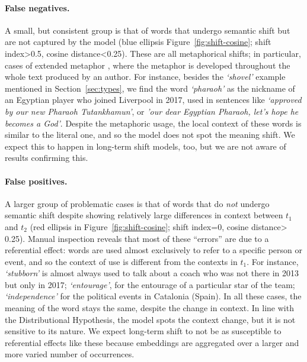 \paragraph{False negatives.}
A small, but consistent group is that of %
words that undergo semantic shift but are not captured by the model
(blue ellipsis Figure~\ref{fig:shift-cosine}; shift index\textgreater 0.5, cosine distance\textless 0.25).
These are all metaphorical shifts; in particular, cases of extended
metaphor \cite{werth1994extended}, where the metaphor is 
developed throughout the whole text produced by an author. For instance, besides the {\em `shovel'} example mentioned in Section~\ref{sec:types}, we find the word {\em `pharaoh'} as the nickname of an Egyptian player who
joined Liverpool in 2017, used in
sentences like \textit{`approved by our new Pharaoh Tutankhamun'}, or \textit{'our dear Egyptian Pharaoh, let's hope he becomes a God'}.
Despite the metaphoric usage, the local context of these words is similar to the literal one, and so the model does not spot the meaning shift. We expect this to happen in long-term shift models, too, but we are not aware of results confirming this.

\paragraph{False positives.}
A larger group of problematic cases is that of %
words that do \textit{not} undergo semantic shift despite showing
relatively large differences in context between $t_1$ and $t_2$ (red ellipsis in
Figure~\ref{fig:shift-cosine}; shift index=0, cosine distance\textgreater	
0.25). Manual inspection reveals that most of these ``errors'' 
are due to a referential effect: words are used
almost exclusively to refer to a specific person or event, and
so the context of use is different from the contexts in $t_1$.
For instance, {\em `stubborn'} is
almost always used to talk about a coach who was not
there in 2013 but only in 2017; 
{\em `entourage'}, for the entourage of a particular star of the team; {\em `independence'} for the
political events in Catalonia (Spain). 
In all these cases, the meaning of the word stays the same, %
despite the change in context. In line with the Distributional
Hypothesis, the model spots the context change, but it is not
sensitive to its nature. We expect long-term shift to not be as
susceptible to referential effects 
like these because
embeddings are aggregated over a larger and more varied number of
occurrences.

